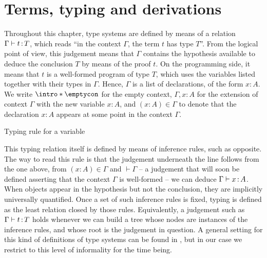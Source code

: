 \section{Terms, typing and derivations}
\label{sec:tech-typing}

\AP Throughout this chapter, type systems are defined by means of a relation
$\Gamma \vdash t \ty T$, which reads “in the context $\Gamma$, the term $t$ has type $T$”.
From the logical point of view, this judgement means that $\Gamma$
contains the hypothesis available to deduce the
conclusion $T$ by means of the proof $t$.
On the programming side, it means that $t$ is a well-formed program of type $T$,
which uses the variables listed together with their types in $\Gamma$.
Hence, $\Gamma$ is a list of declarations, of the form $x : A$.
We write $\intro*\emptycon$ for the empty context,
$\Gamma, x : A$ for the extension of context $\Gamma$ with the new variable $x : A$,
and $(x : A) \in \Gamma$ to denote that the declaration $x : A$ appears at some
point in the context $\Gamma$.

\begin{marginfigure}
  \ContinuedFloat*
  \begin{mathpar}
  \label{rule:cic-var}
  \end{mathpar}
  \caption{Typing rule for a variable}
  \label{fig:cic-var}
\end{marginfigure}

This typing relation itself is defined by means of inference rules,
such as  opposite. The way to read this rule is that the judgement
underneath the line follows from the one above,
\ie from $(x : A) \in \Gamma$
and $\vdash \Gamma$ – a judgement that will soon be defined asserting that the context
$\Gamma$ is well-formed – we can deduce $\Gamma \vdash x \ty A$.
When objects appear in the hypothesis but not the conclusion, they are implicitly
universally quantified.
Once a set of such inference rules is fixed,
typing is defined as the least relation closed by those
rules. Equivalently, a judgement such as $\Gamma \vdash t \ty T$
holds whenever we can build a tree whose nodes are instances of the inference rules,
and whose root is the judgement in question. A general setting
for this kind of definitions of type systems can be found in ,
but in our case we restrict to this level of informality for the time being.%

